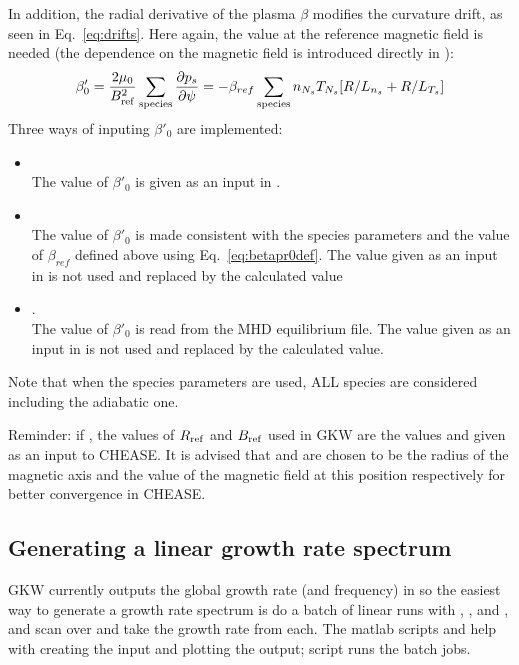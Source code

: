 In addition, the radial derivative of the plasma $\beta$ modifies the curvature drift, as seen in Eq.~\ref{eq:drifts}. Here again, the value at the
reference magnetic field is needed (the dependence on the magnetic field is introduced directly in ): 
\begin{equation}
\label{eq:betapr0def}
 \beta'_0 = \frac{2\mu_0}{B_{\mathrm{ref}}^2}\sum_{\mathrm{species}}\frac{\partial p_s}{\partial \psi} = - \beta_{ref} \sum_{\mathrm{species}}  n_{N_s} T_{N_s}
[R/L_{n_s} + R/L_{T_s}]
\end{equation}
Three ways of inputing $\beta'_0$ are implemented:
\begin{itemize}
 \item {}\\
The value of $\beta'_0$ is given as an input in .
 \item {}\\
The value of $\beta'_0$ is made consistent with the species parameters and the value of $\beta_{ref}$ defined above
using Eq.~\ref{eq:betapr0def}. The value given as an input in  is not used and replaced by the calculated value
 \item {}. \\
The value of $\beta'_0$ is read from the MHD equilibrium file. The value given as an input in 
is not used and replaced by the calculated value.
\end{itemize}

Note that when the species parameters are used, ALL species are considered including the adiabatic one.

Reminder: if , the values of $R_{\mathrm{ref}}$ and $B_{\mathrm{ref}}$ used in GKW are the values 
and  given as an input to CHEASE. It is advised that  and  are chosen to be the radius of the magnetic axis and
the value of the magnetic field at this position respectively for better convergence in CHEASE.
 
\subsection{Generating a linear growth rate spectrum}
GKW currently outputs the global growth rate (and frequency) in  so the easiest way to generate a growth rate spectrum is do a batch of linear runs with , , and , and scan over  and take the growth rate from each. 
The matlab scripts  and  help with creating the input and plotting the output; 
script  runs the batch jobs. 


